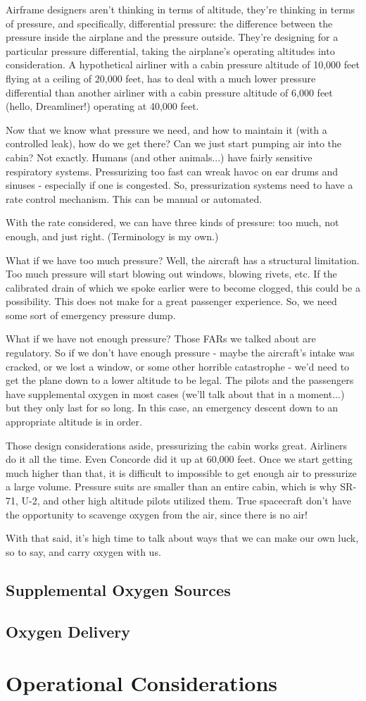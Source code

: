 Airframe designers aren't thinking in terms of altitude, they're thinking in terms of pressure, and specifically, differential pressure: the difference between the pressure inside the airplane and the pressure outside. They're designing for a particular pressure differential, taking the airplane's operating altitudes into consideration. A hypothetical airliner with a cabin pressure altitude of 10,000 feet flying at a ceiling of 20,000 feet, has to deal with a much lower pressure differential than another airliner with a cabin pressure altitude of 6,000 feet (hello, Dreamliner!) operating at 40,000 feet.

Now that we know what pressure we need, and how to maintain it (with a controlled leak), how do we get there? Can we just start pumping air into the cabin? Not exactly. Humans (and other animals...) have fairly sensitive respiratory systems. Pressurizing too fast can wreak havoc on ear drums and sinuses - especially if one is congested. So, pressurization systems need to have a rate control mechanism. This can be manual or automated.

With the rate considered, we can have three kinds of pressure: too much, not enough, and just right. (Terminology is my own.)

What if we have too much pressure? Well, the aircraft has a structural limitation. Too much pressure will start blowing out windows, blowing rivets, etc. If the calibrated drain of which we spoke earlier were to become clogged, this could be a possibility. This does not make for a great passenger experience. So, we need some sort of emergency pressure dump.

What if we have not enough pressure? Those FARs we talked about are regulatory. So if we don't have enough pressure - maybe the aircraft's intake was cracked, or we lost a window, or some other horrible catastrophe - we'd need to get the plane down to a lower altitude to be legal. The pilots and the passengers have supplemental oxygen in most cases (we'll talk about that in a moment...) but they only last for so long. In this case, an emergency descent down to an appropriate altitude is in order.

Those design considerations aside, pressurizing the cabin works great. Airliners do it all the time. Even Concorde did it up at 60,000 feet. Once we start getting much higher than that, it is difficult to impossible to get enough air to pressurize a large volume. Pressure suits are smaller than an entire cabin, which is why SR-71, U-2, and other high altitude pilots utilized them. True spacecraft don't have the opportunity to scavenge oxygen from the air, since there is no air!

With that said, it's high time to talk about ways that we can make our own luck, so to say, and carry oxygen with us.

\subsection{Supplemental Oxygen Sources}

\subsection{Oxygen Delivery}



\section{Operational Considerations}

